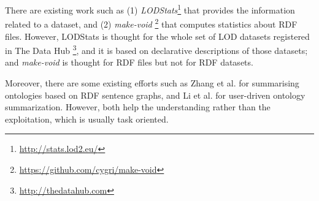 There are existing work such as (1) \emph{LODStats}\footnote{\footnotesize \url{http://stats.lod2.eu/}} that provides the information related to a dataset, and (2) \emph{make-void} \footnote{\footnotesize \url{https://github.com/cygri/make-void}} that computes statistics about RDF files. However, LODStats is thought for the whole set of LOD datasets registered in The Data Hub \footnote{\footnotesize \url{http://thedatahub.com}}, and it is based on declarative descriptions of those datasets; and \emph{make-void} is thought for RDF files but not for RDF datasets.

Moreover, there are some existing efforts such as Zhang et al.\cite{ZhangCQ07} for summarising ontologies based on RDF sentence graphs, and Li et al. \cite{LiM10} for user-driven ontology summarization. However, both help the understanding rather than the exploitation, which is usually task oriented.

